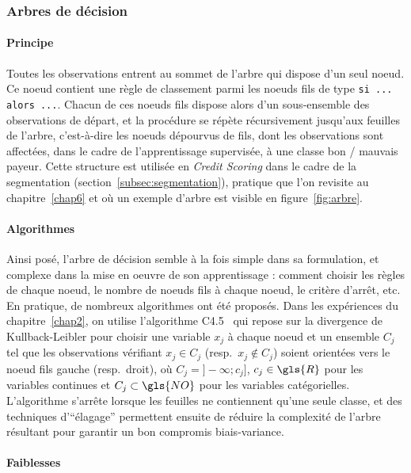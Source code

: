 \subsubsection{Arbres de décision}

\paragraph{Principe}

Toutes les observations entrent au sommet de l'arbre qui dispose d'un seul noeud. Ce noeud contient une règle de classement parmi les noeuds fils de type \verb|si ... alors ...|. Chacun de ces noeuds fils dispose alors d'un sous-ensemble des observations de départ, et la procédure se répète récursivement jusqu'aux feuilles de l'arbre, c'est-à-dire les noeuds dépourvus de fils, dont les observations sont affectées, dans le cadre de l'apprentissage supervisée, à une classe bon / mauvais payeur. Cette structure est utilisée en \textit{Credit Scoring} dans le cadre de la segmentation (section~\ref{subsec:segmentation}), pratique que l'on revisite au chapitre~\ref{chap6} et où un exemple d'arbre est visible en figure~\ref{fig:arbre}.

\paragraph{Algorithmes}

Ainsi posé, l'arbre de décision semble à la fois simple dans sa formulation, et complexe dans la mise en oeuvre de son apprentissage : comment choisir les règles de chaque noeud, le nombre de noeuds fils à chaque noeud, le critère d'arrêt, etc. En pratique, de nombreux algorithmes ont été proposés. Dans les expériences du chapitre~\ref{chap2}, on utilise l'algorithme C4.5~\cite{quinlan2014c4} qui repose sur la divergence de Kullback-Leibler pour choisir une variable $x_j$ à chaque noeud et un ensemble $C_j$ tel que les observations vérifiant $x_j \in C_j$ (resp.\ $x_j \not\in C_j$) soient orientées vers le noeud fils gauche (resp.\ droit), où $C_j = ]- \infty ; c_j]$, $c_j \in \gls{R}$ pour les variables continues et $C_j \subset \gls{NO}$ pour les variables catégorielles. L'algorithme s'arrête lorsque les feuilles ne contiennent qu'une seule classe, et des techniques d'``élagage'' permettent ensuite de réduire la complexité de l'arbre résultant pour garantir un bon compromis biais-variance.

\paragraph{Faiblesses}

